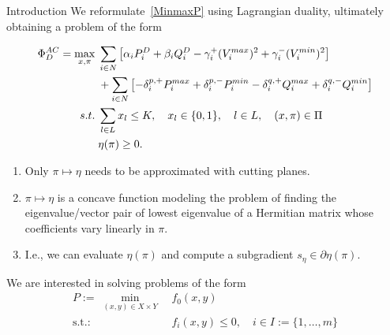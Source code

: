 \documentclass[xcolor=dvipsnames]{beamer}
\begin{document}
\begin{frame}{Introduction}
We reformulate~\eqref{MinmaxP} using Lagrangian duality, ultimately obtaining a problem of the form
\begin{footnotesize}
\begin{subequations}\label{singlelevel}
\begin{align}
  \Phi_D^{AC} = \max_{x,\pi} \;
	& \sum_{i \in N} \left[ \alpha_i P^D_i + \beta_i Q^D_i - \gamma_i^+ (V_i^{max})^2 + \gamma_i^- (V_i^{min})^2 \right]\\
	& + \sum_{i \in N} \left[ -\delta_i^{p,+} P_i^{max} + \delta_i^{p,-} P_i^{min} - \delta_i^{q,+} Q_i^{max} + \delta_i^{q,-} Q_i^{min} \right]\notag \\
	s.t.\; &\sum_{l\in L} x_l \leq K,\quad x_l \in \{0,1\}, \quad l\in L, \quad (x,\pi) \in \Pi\\
	& \eta(\pi) \geq 0. \label{eq:etaconstraint}
\end{align}
\end{subequations}
\end{footnotesize}
\begin{enumerate}
\item Only $\pi \mapsto \eta$ needs to be approximated with cutting planes.
\item $\pi \mapsto \eta$ is a concave function modeling the problem of finding the eigenvalue/vector pair of lowest eigenvalue of a Hermitian matrix whose coefficients
vary linearly in $\pi$. 
\item I.e., we can evaluate $\eta(\pi)$ and compute a subgradient $s_\eta \in \partial \eta(\pi)$.
\end{enumerate}
\end{frame}

\begin{frame}
  
    We are interested in solving problems of the form
    \begin{align*}    
      P:= ~ \min_{(x,y) \in X \times Y} \ & f_0(x,y) \\
        \text{s.t.: } &f_i(x,y) \le 0, \quad i \in I:=\{1,\dots,m\}
    \end{align*} 



\end{frame}
\end{document}
